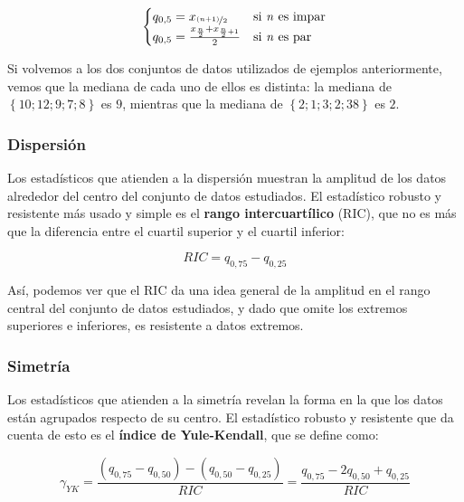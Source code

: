 \documentclass[12pt]{article}
\begin{document}
\begin{equation}
\begin{cases}
q_{0,5} = x_{\nicefrac{(n + 1)}{2}} &\text{si \textit{n} es impar}\\
q_{0,5} = \frac{x_{\frac{n}{2}} + x_{\frac{n}{2} + 1}}{2} &\text{si \textit{n} es par}
\end{cases}
\label{eq:median}
\end{equation}

Si volvemos a los dos conjuntos de datos utilizados de ejemplos anteriormente, vemos que la mediana de cada uno de ellos es distinta: la mediana de $\left\lbrace 10; 12; 9; 7; 8 \right\rbrace$ es $9$, mientras que la mediana de $\left\lbrace 2; 1; 3; 2; 38 \right\rbrace$ es $2$.

\subsubsection{Dispersión}

Los estadísticos que atienden a la dispersión muestran la amplitud de los datos alrededor del centro del conjunto de datos estudiados. El estadístico robusto y resistente más usado y simple es el \textbf{rango intercuartílico} (RIC), que no es más que la diferencia entre el cuartil superior y el cuartil inferior:

\begin{equation}
RIC = q_{0,75} - q_{0,25}
\label{eq:ric}
\end{equation}

Así, podemos ver que el RIC da una idea general de la amplitud en el rango central del conjunto de datos estudiados, y dado que omite los extremos superiores e inferiores, es resistente a datos extremos.

\subsubsection{Simetría}

Los estadísticos que atienden a la simetría revelan la forma en la que los datos están agrupados respecto de su centro. El estadístico robusto y resistente que da cuenta de esto es el \textbf{índice de Yule-Kendall}, que se define como:

\begin{equation}
\gamma_{YK} = \frac{(q_{0,75} - q_{0,50}) - (q_{0,50} - q_{0,25})}{RIC} = \frac{q_{0,75} - 2 q_{0,50} + q_{0,25}}{RIC}
\label{eq:yule-kendall}
\end{equation}
\end{document}
